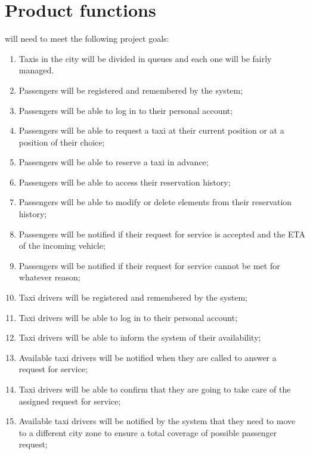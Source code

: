 \section{Product functions}
\label{sec:goals}
\mts{} will need to meet the following project goals:
\begin{enumerate}

\item Taxis in the city will be divided in queues and each one will be fairly managed.
\item Passengers will be registered and remembered by the system;
\item Passengers will be able to log in to their personal account;
\item Passengers will be able to request a taxi at their current position or at a position of their choice;
\item Passengers will be able to reserve a taxi in advance;
\item Passengers will be able to access their reservation history;
\item Passengers will be able to modify or delete elements from their reservation history;
\item Passengers will be notified if their request for service is accepted and the ETA of the incoming vehicle;
\item Passengers will be notified if their request for service cannot be met for whatever reason;
\item Taxi drivers will be registered and remembered by the system;
\item Taxi drivers will be able to log in to their personal account;
\item Taxi drivers will be able to inform the system of their availability;
\item Available taxi drivers will be notified when they are called to answer a request for service;
\item Taxi drivers will be able to confirm that they are going to take care of the assigned request for service;
\item Available taxi drivers will be notified by the system that they need to move to a different city zone to ensure a total coverage of possible passenger request;

\end{enumerate}

